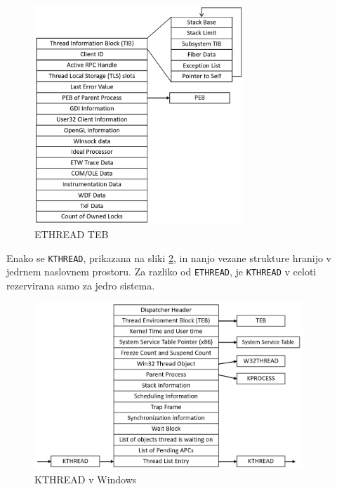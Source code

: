 \documentclass[a4paper,12pt,openright]{book}
\begin{document}
\begin{figure}[h!]
	\begin{center}
		\includegraphics[width=0.7\textwidth]{images/windows_ethread_teb.png}
	\end{center}
	\caption{ETHREAD TEB \cite{Yosifovich_Russinovich_Solomon_Ionescu_2017}}
	\label{fig:windows_ethread_tib}
\end{figure}

Enako se \texttt{KTHREAD}, prikazana na sliki \ref{fig:windows_kthread}, in nanjo vezane strukture hranijo v jedrnem naslovnem prostoru.
Za razliko od \texttt{ETHREAD}, je \texttt{KTHREAD} v celoti rezervirana samo za jedro sistema.

\begin{figure}[h!]
	\begin{center}
		\includegraphics[width=0.9\textwidth]{images/windows_kthread.png}
	\end{center}
	\caption{KTHREAD v Windows \cite{Yosifovich_Russinovich_Solomon_Ionescu_2017}}
	\label{fig:windows_kthread}
\end{figure}
\end{document}
